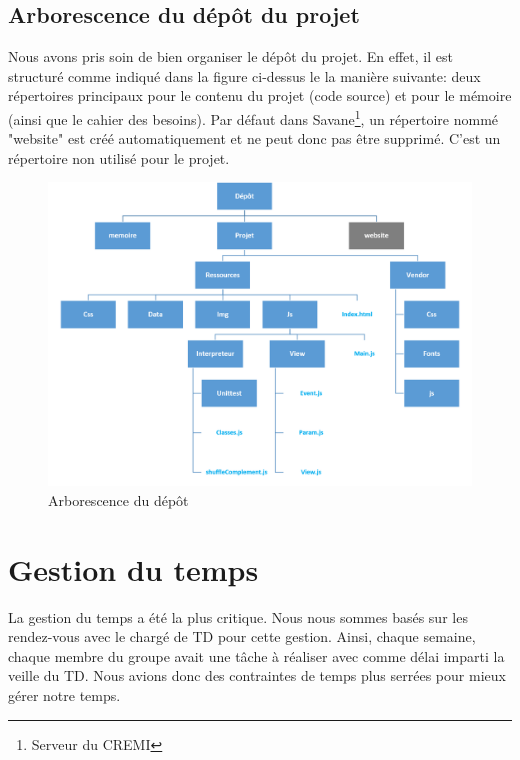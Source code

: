 \subsection*{Arborescence du dépôt du projet}%
Nous avons pris soin de bien organiser le dépôt du projet. En effet, il est structuré comme indiqué dans la figure ci-dessus le la manière suivante: deux répertoires principaux pour le contenu du projet (code source) et pour le mémoire (ainsi que le cahier des besoins). Par défaut dans Savane\footnote{Serveur du CREMI}, un répertoire nommé "website" est créé automatiquement et ne peut donc pas être supprimé. C'est un répertoire non utilisé pour le projet.\\

\begin{figure}[H]
  \centering
    \includegraphics[scale=0.7]{images/arborescence.png}
        \caption{Arborescence du dépôt}
\end{figure}

\section{Gestion du temps}%

La gestion du temps a été la plus critique. Nous nous sommes basés sur les rendez-vous avec le chargé de TD pour cette gestion. Ainsi, chaque semaine, chaque membre du groupe avait une tâche à réaliser avec comme délai imparti la veille du TD. Nous avions donc des contraintes de temps plus serrées pour mieux gérer notre temps.


